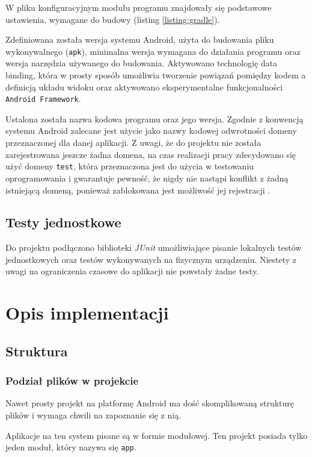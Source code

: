 \documentclass[polish,polish,a4paper,12pt]{article}
\let\sectioncmd\section
\renewcommand{\section}{\clearpage\sectioncmd}
\begin{document}
	W pliku konfiguracyjnym modułu programu znajdowały się podstawowe ustawienia, wymagane do budowy (listing \ref{listing:gradle}).

	Zdefiniowana została wersja systemu Android, użyta do budowania pliku wykonywalnego (\texttt{apk}), minimalna wersja wymagana do działania programu oraz wersja narzędzia używanego do budowania. Aktywowano technologię data binding, która w prosty sposób umożliwia tworzenie powiązań pomiędzy kodem a definicją układu widoku oraz aktywowano eksperymentalne funkcjonalności \texttt{Android Framework}.

	Ustalona została nazwa kodowa programu oraz jego wersja. Zgodnie z konwencją systemu Android zalecane jest użycie jako nazwy kodowej odwrotności domeny przeznaczonej dla danej aplikacji. Z uwagi, że do projektu nie została zarejestrowana jeszcze żadna domena, na czas realizacji pracy zdecydowano się użyć domeny \texttt{test}, która przeznaczona jest do użycia w testowaniu oprogramowania i gwarantuje pewność, że nigdy nie nastąpi konflikt z żadną istniejącą domeną, ponieważ zablokowana jest możliwość jej rejestracji \cite{testdomainwiki}.

	\subsection{Testy jednostkowe}

	Do projektu podłączono biblioteki \textit{JUnit} umożliwiające pisanie lokalnych testów jednostkowych oraz testów wykonywanych na fizycznym urządzeniu. Niestety z uwagi na ograniczenia czasowe do aplikacji nie powstały żadne testy.

\section{Opis implementacji}\label{implementation}
	\subsection{Struktura}
		\subsubsection{Podział plików w projekcie}

		Nawet prosty projekt na platformę Android ma dość skomplikowaną strukturę plików i wymaga chwili na zapoznanie się z nią.

		Aplikacje na ten system pisane są w formie modułowej. Ten projekt posiada tylko jeden moduł, który nazywa się \texttt{app}.
\end{document}
